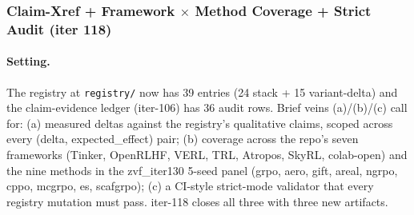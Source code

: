 
\subsubsection{Claim-Xref + Framework $\times$ Method Coverage + Strict Audit (iter 118)}
\label{sec:p6-iter118-claim-xref}

\paragraph{Setting.}
The registry at \texttt{registry/} now has 39 entries (24 stack + 15
variant-delta) and the claim-evidence ledger (iter-106) has 36 audit rows.
Brief veins (a)/(b)/(c) call for: (a) measured deltas against the registry's
qualitative claims, scoped across every (delta, expected\_effect) pair;
(b) coverage across the repo's seven frameworks
(Tinker, OpenRLHF, VERL, TRL, Atropos, SkyRL, colab-open) and the nine
methods in the zvf\_iter130 5-seed panel (grpo, aero, gift, areal, ngrpo,
cppo, mcgrpo, es, scafgrpo); (c) a CI-style strict-mode validator that
every registry mutation must pass. iter-118 closes all three with three
new artifacts.

